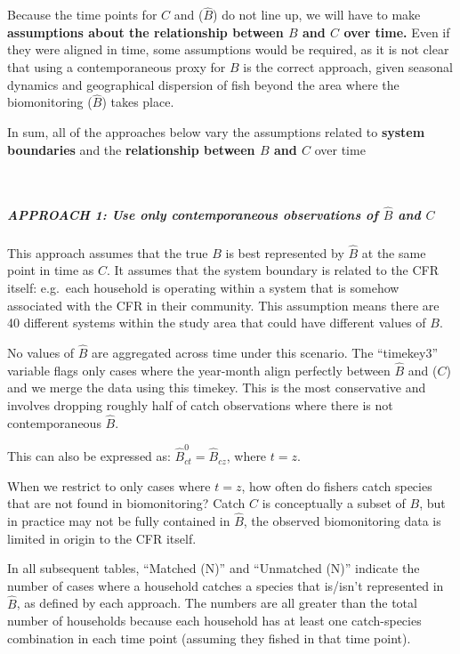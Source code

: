 \documentclass[
]{article}
\begin{document}
Because the time points for \(C\) and (\(\hat{B}\)) do not line up, we
will have to make \textbf{assumptions about the relationship between
\(B\) and \(C\) over time.} Even if they were aligned in time, some
assumptions would be required, as it is not clear that using a
contemporaneous proxy for \(B\) is the correct approach, given seasonal
dynamics and geographical dispersion of fish beyond the area where the
biomonitoring (\(\hat{B}\)) takes place.

In sum, all of the approaches below vary the assumptions related to
\textbf{system boundaries} and the \textbf{relationship between \(B\)
and \(C\)} over time\\
\strut \\

\hypertarget{approach-1-use-only-contemporaneous-observations-of-hatb-and-c}{%
\subparagraph{\texorpdfstring{\textbf{APPROACH 1: Use only
contemporaneous observations of \(\hat{B}\) and
\(C\)}}{APPROACH 1: Use only contemporaneous observations of \textbackslash hat\{B\} and C}}\label{approach-1-use-only-contemporaneous-observations-of-hatb-and-c}}

\hfill\break
\hfill\break
This approach assumes that the true \(B\) is best represented by
\(\hat{B}\) at the same point in time as \(C\). It assumes that the
system boundary is related to the CFR itself: e.g.~each household is
operating within a system that is somehow associated with the CFR in
their community. This assumption means there are 40 different systems
within the study area that could have different values of \(B\).

No values of \(\hat{B}\) are aggregated across time under this scenario.
The ``timekey3'' variable flags only cases where the year-month align
perfectly between \(\hat{B}\) and (\(C\)) and we merge the data using
this timekey. This is the most conservative and involves dropping
roughly half of catch observations where there is not contemporaneous
\(\hat{B}\).

This can also be expressed as: \(\hat{B}_{ct}^0 = \hat{B}_{cz}\), where
\(t = z\).

When we restrict to only cases where \(t = z\), how often do fishers
catch species that are not found in biomonitoring? Catch \(C\) is
conceptually a subset of \(B\), but in practice may not be fully
contained in \(\hat{B}\), the observed biomonitoring data is limited in
origin to the CFR itself.

In all subsequent tables, ``Matched (N)'' and ``Unmatched (N)'' indicate
the number of cases where a household catches a species that is/isn't
represented in \(\hat{B}\), as defined by each approach. The numbers are
all greater than the total number of households because each household
has at least one catch-species combination in each time point (assuming
they fished in that time point).
\end{document}
